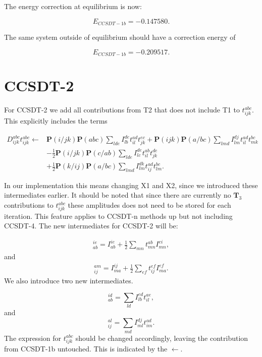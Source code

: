 \documentclass[a4paper,norsk,11pt,twoside]{report}
\begin{document}
The energy correction at equilibrium is now:

\begin{equation} 
E_{CCSDT-1b} = -0.147580 .
\end{equation}

The same system outside of equilibrium should have a correction energy of

\begin{equation}
E_{CCSDT-1b} = -0.209517  .
\end{equation}

\section{CCSDT-2}
For CCSDT-2 we add all contributions from T2 that does not include T1 to $t_{ijk}^{abc}$. This explicitly includes the terms

\begin{align}
D_{ijk}^{abc} t_{ijk}^{abc} \leftarrow & 
\textbf{P}(i/jk) \textbf{P}(abc) \sum_{lde} I_{lb}^{de} t_{il}^{ad} t_{jk}^{ec}
+ \textbf{P}(ijk) \textbf{P}(a/bc) \sum_{lmd} I_{lm}^{dj} t_{il}^{ad} t_{mk}^{bc} \nonumber \\ &
- \frac{1}{2} \textbf{P}(i/jk) \textbf{P}(c/ab) \sum_{lde} I_{lc}^{de} t_{il}^{ab} t_{jk}^{de} \nonumber \\ & 
 + \frac{1}{2} \textbf{P}(k/ij) \textbf{P}(a/bc) \sum_{lmd} I_{lm}^{dk} t_{ij}^{ad} t_{lm}^{bc}  .
\end{align}

In our implementation this means changing X1 and X2, since we introduced these intermediates earlier. It should be noted that since there are currently no $\textbf{T}_3$ contributions to $t_{ijk}^{abc}$ these amplitudes does not need to be stored for each iteration. This feature applies to CCSDT-n methods up but not including CCSDT-4. The new intermediates for CCSDT-2 will be:

\begin{align}
[X1]_{ab}^{ie} = I_{ab}^{ie} +
\frac{1}{2} \sum_{mn} t_{mn}^{ab} I_{mn}^{ei} ,
\end{align}
and
\begin{align}
[X2]_{ij}^{am} = I_{ma}^{ij} + \frac{1}{2} \sum_{ef} t_{ij}^{ef} I_{ma}^{ef}  .
\end{align}
We also introduce two new intermediates.

\begin{equation}
[X12]_{ab}^{id} = \sum_{ld} I_{lb}^{ed} t_{il}^{ae} ,
\end{equation}
and
\begin{equation}
[X13]_{ij}^{al} = \sum_{md} I_{ml}^{dj} t^{ad}_{im} .
\end{equation}
The expression for $t_{ijk}^{abc}$ should be changed accordingly, leaving the contribution from CCSDT-1b untouched. This is indicated by the $\leftarrow$. 
\end{document}
